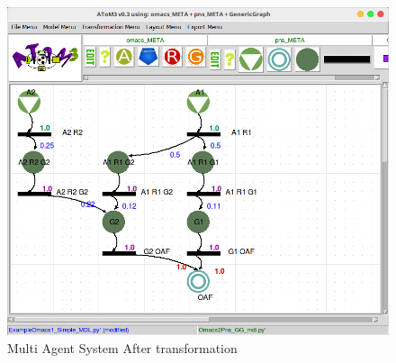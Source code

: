 \begin{figure}[th]
	\centering
 	\includegraphics[scale=0.5]{chapiter3/img/ex1pns}
	\caption{\label{fig:Multi Agent System After transformation }Multi Agent System After transformation}
\end{figure} 


%
%

